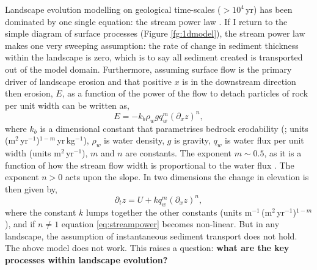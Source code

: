 Landscape evolution modelling on geological time-scales ($>10^{4}$\,yr) has been dominated by one single equation: the stream power law \citep[see][]{howard-1983,howard-1994}. If I return to the simple diagram of surface processes (Figure \ref{fg:1dmodel}), the stream power law makes one very sweeping assumption: the rate of change in sediment thickness within the landscape is zero, which is to say all sediment created is transported out of the model domain. Furthermore, assuming surface flow is the primary driver of landscape erosion and that positive $x$ is in the downstream direction then erosion, $E$, as a function of the power of the flow to detach particles of rock per unit width can be written as,
\begin{equation}
E = -k_{b}\rho_{w}gq_{w}^{m}\left(\partial_{x}z\right)^{n},
\label{eq:streampower-inv}
\end{equation}
where $k_{b}$ is a dimensional constant that parametrises bedrock erodability (\citealp{howard-1983}; units (m$^{2}$\,yr$^{-1}$)$^{1-m}$\,yr\,kg$^{-1}$), $\rho_{w}$ is water density, $g$ is gravity, $q_{w}$ is water flux per unit width (units m$^{2}$\,yr$^{-1}$),  $m$ and $n$ are constants. The exponent $m \sim 0.5$, as it is a function of how the stream flow width is proportional to the water flux \citep[e.g.][]{lacey-1930,leopold-1953,whittaker-etal-2007}. The exponent $n>0$ acts upon the slope. In two dimensions the change in elevation is then given by,
\begin{equation}
\partial_{t}z = U + kq_{w}^{m}\left(\partial_{x}z\right)^{n},
\label{eq:streampower}
\end{equation}
where the constant $k$ lumps together the other constants (units m$^{-1}$\,(m$^{2}$\,yr$^{-1}$)$^{1-m}$), and if $n\neq1$ equation \ref{eq:streampower} becomes non-linear. But in any landscape, the assumption of instantaneous sediment transport does not hold. The above model does not work. This raises a question: {\bf what are the key processes within landscape evolution?}

